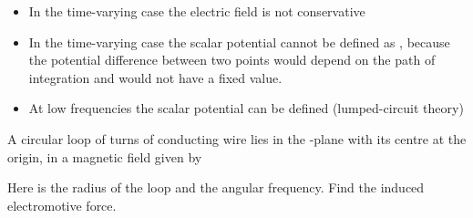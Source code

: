 \begin{ELunit}

\begin{itemize}
\tightlist
\item
  In the time-varying case the electric field is not conservative \ELim{\ELto} 
\item
  In the time-varying case the scalar potential cannot be defined as , because the potential difference between two points would depend on the path of integration and would not have a fixed value.
\item
  At low frequencies \ELim{\ELto}  \ELim{\ELto} the scalar potential can be defined (lumped-circuit theory)
\end{itemize}

\end{ELunit}


\begin{ELexample}{}

A circular loop of  turns of conducting wire lies in the -plane with its centre at the origin, in a magnetic field given by


Here  is the radius of the loop and \ELim{\omega} the angular frequency. Find the induced electromotive force.

\begin{ELsolution}


\end{ELsolution}

\end{ELexample}

\ELhold


